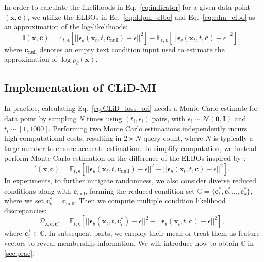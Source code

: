 In order to calculate the likelihoods in Eq.~\eqref{eq:indicator} for a given data point $(\mathbf{x},\mathbf{c})$, we utilize the ELBOs in Eq.~\eqref{eq:ddpm_elbo} and Eq.~\eqref{eq:cdm_elbo}  as an approximation of the log-likelihoods:
\begin{equation}\label{eq:CLiD_loss_ori}
     \mathbb{I}(\mathbf{x},\mathbf{c}) =
     \mathbb{E}_{ t, \mathbf{\epsilon}} \left[|| \mathbf{\epsilon}_{\theta}( \mathbf{x}_t    , t, \mathbf{c}_{\text{null}}) - \epsilon ||^2
     \right] 
     -  
     \mathbb{E}_{ t, \mathbf{\epsilon}} \left[
     || \mathbf{\epsilon}_{\theta}( \mathbf{x}_t    , t, \mathbf{c}) - \epsilon ||^2 \right],
\end{equation}
where $\mathbf{c}_{\text{null}}$ denotes an empty text condition input used to estimate the approximation of $\log p_\theta(\mathbf{x})$.


\subsection{Implementation of CLiD-MI}\label{sec:clid_mi}

In practice, calculating Eq.~\eqref{eq:CLiD_loss_ori} needs a Monte Carlo estimate for data point by 
sampling $N$ times using $(t_i, \epsilon_i)$
pairs, with $\epsilon_i \sim \mathcal{N}(\mathbf{0},\mathbf{I})$ and  $t_i \sim [1,1000] $. Performing two Monte Carlo estimations independently incurs high computational costs, resulting in $2 \times N$ query count, where  $N$ is typically a large number to ensure accurate estimation. To simplify computation, we instead perform Monte Carlo estimation on the difference of the ELBOs inspired by \cite{li2023your}:
\begin{equation}\label{eq:CLiD_loss}
    \mathbb{I}(\mathbf{x},\mathbf{c}) =
     \mathbb{E}_{ t, \mathbf{\epsilon}} \left[|| \mathbf{\epsilon}_{\theta}( \mathbf{x}_t    , t, \mathbf{c}_{\text{null}}) - \epsilon ||^2
     -  
     || \mathbf{\epsilon}_{\theta}( \mathbf{x}_t    , t, \mathbf{c}) - \epsilon ||^2 \right].
\end{equation}
In experiments, to further mitigate randomness, we also consider diverse reduced conditions along with  $\mathbf{c}_{\text{null}}$, forming the reduced condition set  
 $\mathbb{C} = \{\mathbf{c}^*_1, \mathbf{c}^*_2..., \mathbf{c}^*_{k}\}$, where we set 
 $\mathbf{c}^*_{k} = \mathbf{c}_{\text{null}}$. Then we compute multiple condition likelihood discrepancies:
\begin{equation}\label{eq:clid_loss_reduction}
    \mathcal{D}_{\mathbf{x},\mathbf{c},\mathbf{c}^*_i} = 
    \mathbb{E}_{ t, \mathbf{\epsilon}} \left[|| \mathbf{\epsilon}_{\theta}( \mathbf{x}_t    , t, \mathbf{c}^*_i) - \epsilon ||^2
     -  
     || \mathbf{\epsilon}_{\theta}( \mathbf{x}_t    , t, \mathbf{c}) - \epsilon ||^2 \right],
\end{equation}
where $\mathbf{c}_i^* \in \mathbb{C} $. In subsequent parts, we employ their mean or treat them as feature vectors to reveal membership information. We will introduce how to obtain $\mathbb{C}$ in \cref{sec:prac}.

